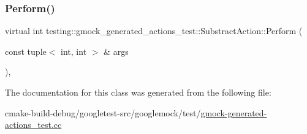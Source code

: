 \subsubsection{\texorpdfstring{Perform()}{Perform()}}
{\footnotesize\ttfamily virtual int testing\+::gmock\+\_\+generated\+\_\+actions\+\_\+test\+::\+Substract\+Action\+::\+Perform (\begin{DoxyParamCaption}\item[{const tuple$<$ int, int $>$ \&}]{args }\end{DoxyParamCaption})\hspace{0.3cm}{\ttfamily [inline]}, {\ttfamily [virtual]}}



The documentation for this class was generated from the following file\+:\begin{DoxyCompactItemize}
\item 
cmake-\/build-\/debug/googletest-\/src/googlemock/test/\mbox{\hyperlink{gmock-generated-actions__test_8cc}{gmock-\/generated-\/actions\+\_\+test.\+cc}}\end{DoxyCompactItemize}
